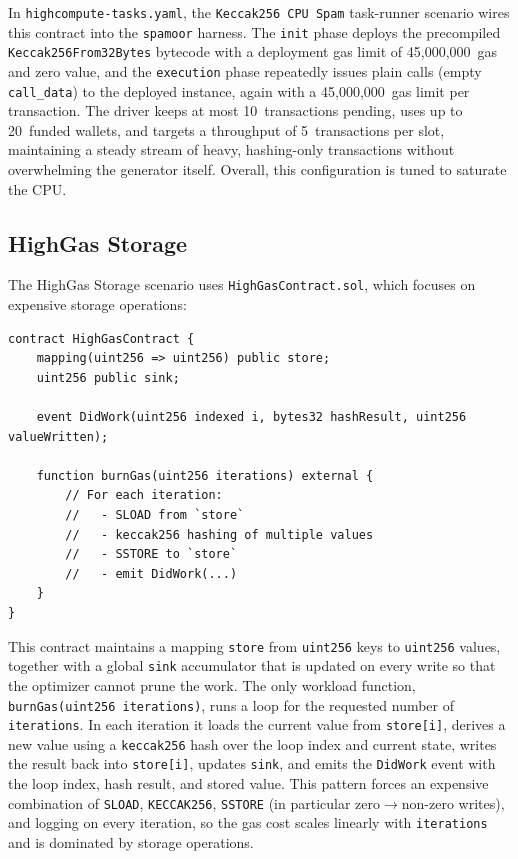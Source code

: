 In \texttt{highcompute-tasks.yaml}, the \texttt{Keccak256 CPU Spam} task-runner scenario wires this contract into the \texttt{spamoor} harness. The \texttt{init} phase deploys the precompiled \texttt{Keccak256From32Bytes} bytecode with a deployment gas limit of 45{,}000{,}000~gas and zero value, and the \texttt{execution} phase repeatedly issues plain calls (empty \texttt{call\_data}) to the deployed instance, again with a 45{,}000{,}000~gas limit per transaction. The driver keeps at most 10~transactions pending, uses up to 20~funded wallets, and targets a throughput of 5~transactions per slot, maintaining a steady stream of heavy, hashing-only transactions without overwhelming the generator itself. Overall, this configuration is tuned to saturate the CPU.

\subsection{HighGas Storage}
The HighGas Storage scenario uses \texttt{HighGasContract.sol}, which focuses on expensive storage operations:

\begin{lstlisting}[caption={HighGasContract for storage-heavy workload},label={lst:highgas-contract}]
contract HighGasContract {
    mapping(uint256 => uint256) public store;
    uint256 public sink;

    event DidWork(uint256 indexed i, bytes32 hashResult, uint256 valueWritten);

    function burnGas(uint256 iterations) external {
        // For each iteration:
        //   - SLOAD from `store`
        //   - keccak256 hashing of multiple values
        //   - SSTORE to `store`
        //   - emit DidWork(...)
    }
}
\end{lstlisting}

This contract maintains a mapping \texttt{store} from \texttt{uint256} keys to \texttt{uint256} values, together with a global \texttt{sink} accumulator that is updated on every write so that the optimizer cannot prune the work. The only workload function, \texttt{burnGas(uint256 iterations)}, runs a loop for the requested number of \texttt{iterations}. In each iteration it loads the current value from \texttt{store[i]}, derives a new value using a \texttt{keccak256} hash over the loop index and current state, writes the result back into \texttt{store[i]}, updates \texttt{sink}, and emits the \texttt{DidWork} event with the loop index, hash result, and stored value. This pattern forces an expensive combination of \texttt{SLOAD}, \texttt{KECCAK256}, \texttt{SSTORE} (in particular zero$\rightarrow$non-zero writes), and logging on every iteration, so the gas cost scales linearly with \texttt{iterations} and is dominated by storage operations.

